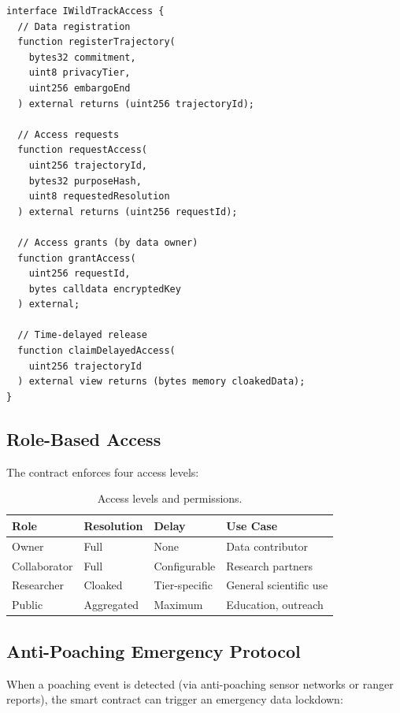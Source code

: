 \documentclass[11pt,letterpaper]{article}
\begin{document}
\begin{lstlisting}[basicstyle=\footnotesize\ttfamily, frame=single, caption={WildTrack access control interface (Solidity-like pseudocode).}]
interface IWildTrackAccess {
  // Data registration
  function registerTrajectory(
    bytes32 commitment,
    uint8 privacyTier,
    uint256 embargoEnd
  ) external returns (uint256 trajectoryId);

  // Access requests
  function requestAccess(
    uint256 trajectoryId,
    bytes32 purposeHash,
    uint8 requestedResolution
  ) external returns (uint256 requestId);

  // Access grants (by data owner)
  function grantAccess(
    uint256 requestId,
    bytes calldata encryptedKey
  ) external;

  // Time-delayed release
  function claimDelayedAccess(
    uint256 trajectoryId
  ) external view returns (bytes memory cloakedData);
}
\end{lstlisting}

\subsection{Role-Based Access}

The contract enforces four access levels:

\begin{table}[htbp]
\centering
\caption{Access levels and permissions.}
\label{tab:access}
\begin{tabular}{lllp{5cm}}
\toprule
\textbf{Role} & \textbf{Resolution} & \textbf{Delay} & \textbf{Use Case} \\
\midrule
Owner & Full & None & Data contributor \\
Collaborator & Full & Configurable & Research partners \\
Researcher & Cloaked & Tier-specific & General scientific use \\
Public & Aggregated & Maximum & Education, outreach \\
\bottomrule
\end{tabular}
\end{table}

\subsection{Anti-Poaching Emergency Protocol}

When a poaching event is detected (via anti-poaching sensor networks or ranger reports), the smart contract can trigger an emergency data lockdown:
\end{document}
